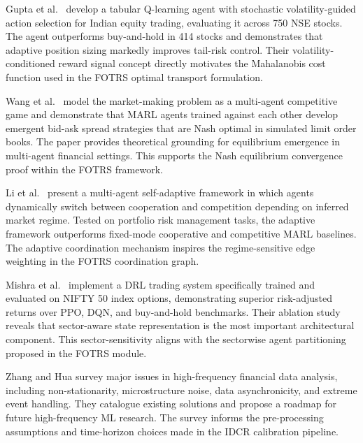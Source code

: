 \documentclass[12pt,a4paper,oneside]{report}
\theoremstyle{definition}
\theoremstyle{remark}
\begin{document}
\medskip

\noindent Gupta et al.\ \cite{Gupta2025VolatilityRL} develop a tabular Q-learning agent with stochastic volatility-guided action selection for Indian equity trading, evaluating it across 750 NSE stocks. The agent outperforms buy-and-hold in 414 stocks and demonstrates that adaptive position sizing markedly improves tail-risk control. Their volatility-conditioned reward signal concept directly motivates the Mahalanobis cost function used in the FOTRS optimal transport formulation.

\medskip

\noindent Wang et al.\ \cite{WangMARLMarketMaking2025} model the market-making problem as a multi-agent competitive game and demonstrate that MARL agents trained against each other develop emergent bid-ask spread strategies that are Nash optimal in simulated limit order books. The paper provides theoretical grounding for equilibrium emergence in multi-agent financial settings. This supports the Nash equilibrium convergence proof within the FOTRS framework.

\medskip

\noindent Li et al.\ \cite{LiMASA2024AAMAS} present a multi-agent self-adaptive framework in which agents dynamically switch between cooperation and competition depending on inferred market regime. Tested on portfolio risk management tasks, the adaptive framework outperforms fixed-mode cooperative and competitive MARL baselines. The adaptive coordination mechanism inspires the regime-sensitive edge weighting in the FOTRS coordination graph.

\medskip

\noindent Mishra et al.\ \cite{Mishra2025NiftyDRL} implement a DRL trading system specifically trained and evaluated on NIFTY 50 index options, demonstrating superior risk-adjusted returns over PPO, DQN, and buy-and-hold benchmarks. Their ablation study reveals that sector-aware state representation is the most important architectural component. This sector-sensitivity aligns with the sectorwise agent partitioning proposed in the FOTRS module.

\medskip

\noindent Zhang and Hua \cite{Zhang2025HFData} survey major issues in high-frequency financial data analysis, including non-stationarity, microstructure noise, data asynchronicity, and extreme event handling. They catalogue existing solutions and propose a roadmap for future high-frequency ML research. The survey informs the pre-processing assumptions and time-horizon choices made in the IDCR calibration pipeline.
\end{document}
